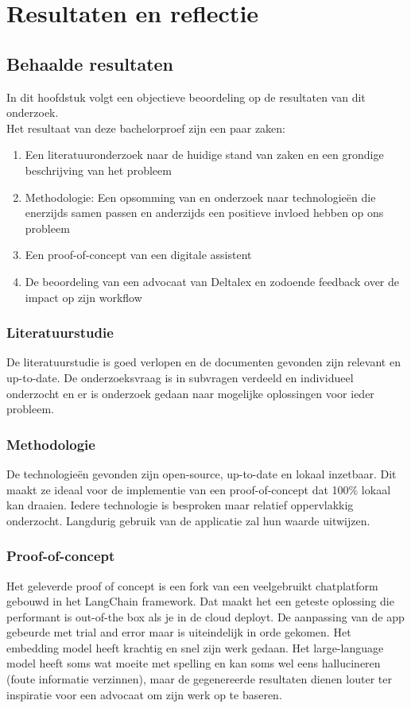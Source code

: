 \chapter{Resultaten en reflectie}
\label{ch:results_reflection}
\section{Behaalde resultaten}
In dit hoofdstuk volgt een objectieve beoordeling op de resultaten van dit onderzoek. \\

Het resultaat van deze bachelorproef zijn een paar zaken:

\begin{enumerate}
	\item Een literatuuronderzoek naar de huidige stand van zaken en een grondige beschrijving van het probleem
	\item Methodologie: Een opsomming van en onderzoek naar technologieën die enerzijds samen passen en anderzijds een positieve invloed hebben op ons probleem
	\item Een proof-of-concept van een digitale assistent
	\item De beoordeling van een advocaat van Deltalex en zodoende feedback over de impact op zijn workflow
\end{enumerate}

\subsection{Literatuurstudie}
De literatuurstudie is goed verlopen en de documenten gevonden zijn relevant en up-to-date.
De onderzoeksvraag is in subvragen verdeeld en individueel onderzocht en er is onderzoek gedaan naar mogelijke oplossingen voor ieder probleem.

\subsection{Methodologie}
De technologieën gevonden zijn open-source, up-to-date en lokaal inzetbaar.
Dit maakt ze ideaal voor de implementie van een proof-of-concept dat 100\% lokaal kan draaien.
Iedere technologie is besproken maar relatief oppervlakkig onderzocht.
Langdurig gebruik van de applicatie zal hun waarde uitwijzen.

\subsection{Proof-of-concept}
Het geleverde proof of concept is een fork van een veelgebruikt chatplatform gebouwd in het LangChain framework.
Dat maakt het een geteste oplossing die performant is out-of-the box als je in de cloud deployt.
De aanpassing van de app gebeurde met trial and error maar is uiteindelijk in orde gekomen.
Het embedding model heeft krachtig en snel zijn werk gedaan.
Het large-language model heeft soms wat moeite met spelling en kan soms wel eens hallucineren (foute informatie verzinnen),
maar de gegenereerde resultaten dienen louter ter inspiratie voor een advocaat om zijn werk op te baseren.

